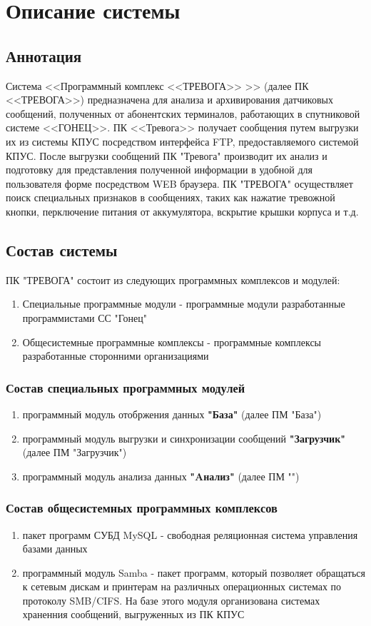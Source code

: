 \documentclass[12pt]{article}[a4paper,14pt,russian]
\begin{document}
	\section{Описание системы}
	\subsection{Аннотация}

	Система <<Программный комплекс <<ТРЕВОГА>> >> (далее ПК <<ТРЕВОГА>>) предназначена для анализа и архивирования датчиковых сообщений, полученных от абонентских терминалов, работающих в спутниковой системе <<ГОНЕЦ>>. ПК <<Тревога>> получает сообщения путем выгрузки их из системы КПУС посредством интерфейса FTP, предоставляемого системой КПУС. После выгрузки сообщений ПК "Тревога" производит их анализ и подготовку для представления полученной информации в удобной для пользователя форме посредством WEB браузера. ПК "ТРЕВОГА" осуществляет поиск специальных признаков в сообщениях, таких как нажатие тревожной кнопки, перключение питания от аккумулятора, вскрытие крышки корпуса и т.д.
	
	\subsection{Состав системы}
    ПК "ТРЕВОГА" состоит из следующих программных комплексов и модулей:
	\begin{enumerate}
	\item  Специальные программные модули - программные модули разработанные программистами  СС "Гонец"
	\item  Общесистемные программные комплексы  - программные комплексы разработанные сторонними организациями
	\end{enumerate}
    \subsubsection {Состав специальных программных модулей}
	\begin{enumerate}
	\item программный модуль отобржения данных \textbf{"База"} (далее ПМ "База")
	\item программный модуль выгрузки и синхронизации сообщений \textbf{"Загрузчик"} (далее ПМ "Загрузчик")
	\item программный модуль анализа данных \textbf{"Aнализ"} (далее ПМ "")
	\end{enumerate}
    \subsubsection {Состав общесистемных программных комплексов}
    \begin{enumerate}
    \item пакет программ СУБД MySQL - свободная реляционная система управления базами данных
    \item программный модуль Samba - пакет программ, который позволяет обращаться к сетевым дискам и принтерам на различных операционных системах по протоколу SMB/CIFS. На базе этого модуля организована системах храненния сообщений, выгруженных из ПК КПУС
    \end{enumerate}
\end{document}
